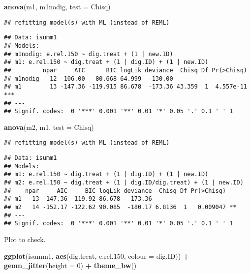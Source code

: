 \documentclass[
]{article}
\newenvironment{Shaded}{\begin{snugshade}}{\end{snugshade}}
\newcommand{\AttributeTok}[1]{\textcolor[rgb]{0.13,0.29,0.53}{#1}}
\newcommand{\DecValTok}[1]{\textcolor[rgb]{0.00,0.00,0.81}{#1}}
\newcommand{\FloatTok}[1]{\textcolor[rgb]{0.00,0.00,0.81}{#1}}
\newcommand{\FunctionTok}[1]{\textcolor[rgb]{0.13,0.29,0.53}{\textbf{#1}}}
\newcommand{\NormalTok}[1]{#1}
\newcommand{\SpecialCharTok}[1]{\textcolor[rgb]{0.81,0.36,0.00}{\textbf{#1}}}
\newcommand{\StringTok}[1]{\textcolor[rgb]{0.31,0.60,0.02}{#1}}
\begin{document}
\begin{Shaded}
\begin{Highlighting}[]
\FunctionTok{anova}\NormalTok{(m1, m1nodig, }\AttributeTok{test =} \StringTok{\textquotesingle{}Chisq\textquotesingle{}}\NormalTok{)}
\end{Highlighting}
\end{Shaded}

\begin{verbatim}
## refitting model(s) with ML (instead of REML)
\end{verbatim}

\begin{verbatim}
## Data: isumm1
## Models:
## m1nodig: e.rel.150 ~ dig.treat + (1 | new.ID)
## m1: e.rel.150 ~ dig.treat + (1 | dig.ID) + (1 | new.ID)
##         npar     AIC      BIC logLik deviance  Chisq Df Pr(>Chisq)    
## m1nodig   12 -106.00  -80.668 64.999  -130.00                         
## m1        13 -147.36 -119.915 86.678  -173.36 43.359  1  4.557e-11 ***
## ---
## Signif. codes:  0 '***' 0.001 '**' 0.01 '*' 0.05 '.' 0.1 ' ' 1
\end{verbatim}

\begin{Shaded}
\begin{Highlighting}[]
\FunctionTok{anova}\NormalTok{(m2, m1, }\AttributeTok{test =} \StringTok{\textquotesingle{}Chisq\textquotesingle{}}\NormalTok{)}
\end{Highlighting}
\end{Shaded}

\begin{verbatim}
## refitting model(s) with ML (instead of REML)
\end{verbatim}

\begin{verbatim}
## Data: isumm1
## Models:
## m1: e.rel.150 ~ dig.treat + (1 | dig.ID) + (1 | new.ID)
## m2: e.rel.150 ~ dig.treat + (1 | dig.ID/dig.treat) + (1 | new.ID)
##    npar     AIC     BIC logLik deviance  Chisq Df Pr(>Chisq)   
## m1   13 -147.36 -119.92 86.678  -173.36                        
## m2   14 -152.17 -122.62 90.085  -180.17 6.8136  1   0.009047 **
## ---
## Signif. codes:  0 '***' 0.001 '**' 0.01 '*' 0.05 '.' 0.1 ' ' 1
\end{verbatim}

Plot to check.

\begin{Shaded}
\begin{Highlighting}[]
\FunctionTok{ggplot}\NormalTok{(isumm1, }\FunctionTok{aes}\NormalTok{(dig.treat, e.rel}\FloatTok{.150}\NormalTok{, }\AttributeTok{colour =}\NormalTok{ dig.ID)) }\SpecialCharTok{+}
  \FunctionTok{geom\_jitter}\NormalTok{(}\AttributeTok{height =} \DecValTok{0}\NormalTok{) }\SpecialCharTok{+}
  \FunctionTok{theme\_bw}\NormalTok{()}
\end{Highlighting}
\end{Shaded}
\end{document}
